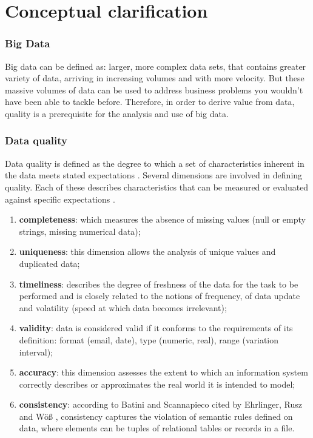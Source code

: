 \section{Conceptual clarification}

\subsubsection{Big Data}

Big data can be defined as: larger, more complex data sets, that contains greater variety of data, arriving in increasing volumes and with more velocity. But these massive volumes of data can be used to address business problems you wouldn't have been able to tackle before. Therefore, in order to derive value from data, quality is a prerequisite for the analysis and use of big data.

\subsubsection{Data quality}
 Data quality is defined as the degree to which a set of characteristics inherent in the data meets stated expectations \cite{Iso8000}. Several dimensions are involved in defining quality. Each of these describes characteristics that can be measured or evaluated against specific expectations \cite{dama}.
 \begin{enumerate}[parsep=0cm,itemsep=0cm]
     \item \textbf{completeness}: which measures the absence of missing values (null or empty strings, missing numerical data);
     \item \textbf{uniqueness}: this dimension allows the analysis of unique values and duplicated data;
     \item \textbf{timeliness}: describes the degree of freshness of the data for the task to be performed and is closely related to the notions of frequency, of data update and volatility (speed at which data becomes irrelevant);
     \item \textbf{validity}: data is considered valid if it conforms to the requirements of its definition: format (email, date), type (numeric, real), range (variation interval);
     \item \textbf{accuracy}: this dimension assesses the extent to which an information system correctly describes or approximates the real world it is intended to model;
     \item \textbf{consistency}: according to Batini and Scannapieco cited by Ehrlinger, Rusz and Wöß \cite{ehrlinger2019survey} , consistency captures the violation of semantic rules defined on data, where elements can be tuples of relational tables or records in a file.
 \end{enumerate}

